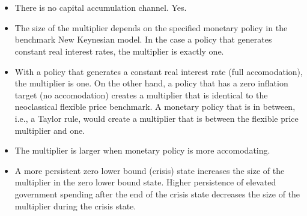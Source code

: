 \documentclass[12pt]{article}
\begin{document}
\section{\cite{woodford_2011}}
\begin{itemize}
    \item There is no capital accumulation channel.
    Yes.
    \item The size of the multiplier depends on the specified monetary policy in the benchmark New Keynesian model.
    In the case a policy that generates constant real interest rates, the multiplier is exactly one.
    \item With a policy that generates a constant real interest rate (full accomodation), the multiplier is one.
    On the other hand, a policy that has a zero inflation target (no accomodation) creates a multiplier that is identical to the neoclassical flexible price benchmark.
    A monetary policy that is in between, i.e., a  Taylor rule, would create a multiplier that is between the flexible price multiplier and one.
    \item The multiplier is larger when monetary policy is more accomodating.
    \item A more persistent zero lower bound (crisis) state increases the size of the multiplier in the zero lower bound state.
    Higher persistence of elevated government spending after the end of the crisis state decreases the size of the multiplier during the crisis state.
\end{itemize}

\printbibliography
\end{document}
